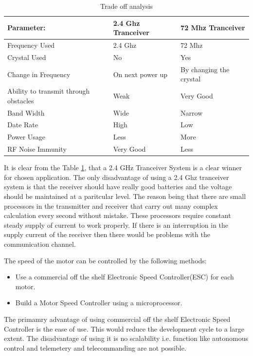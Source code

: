 \begin{center}
\begin{table}[bht]
\begin{tabular}{||l l l||}
\hline\hline
\textbf{Parameter:} &  \textbf{2.4 Ghz Tranceiver} & \textbf{72 Mhz Tranceiver}\\ 
\hline
Frequency Used & 2.4 Ghz & 72 Mhz \\
Crystal Used & No & Yes \\
Change in Frequency & On next power up & By changing the crystal \\
Ability to transmit through obstacles & Weak & Very Good\\
Band Width & Wide & Narrow\\
Date Rate & High & Low\\
Power Usage & Less & More\\
RF Noise Immunity & Very Good & Less \\
\hline
\end{tabular}
\caption{Trade off analysis}
\label{tab:TradeOff}
\end{table}
\end{center}

It is clear from the Table \ref{tab:TradeOff}, that a 2.4 GHz Tranceiver System is a clear winner for chosen application. The only disadvantage of using a 2.4 Ghz tranceiver system is that the receiver should have really good batteries and the voltage should be maintained at a paritcular level. The reason being that there are small processors in the transmitter and receiver that carry out many complex calculation every second without mistake. These processors require constant steady supply of current to work properly. If there is an interruption in the supply current of the receiver then there would be problems with the communication channel.

The speed of the motor can be controlled by the following methods:
\begin{itemize}
\item Use a commercial off the shelf Electronic Speed Controller(ESC) for each motor.
\item Build a Motor Speed Controller using a microprocessor.
\end{itemize}

The primamry advantage of using commercial off the shelf Electronic Speed Controller is the ease of use. This would reduce the development cycle to a large extent. The disadvantage of using it is no scalability i.e. function like autonomous control and telemetery and telecommanding are not possible.

